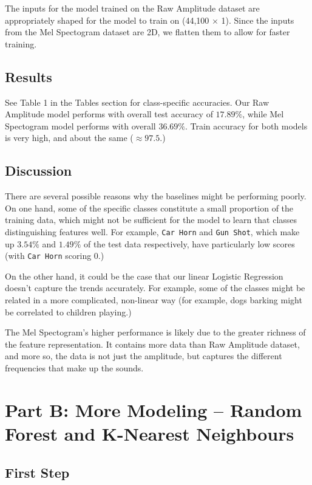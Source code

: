 \documentclass[11pt]{article}
\begin{document}
The inputs for the model trained on the Raw Amplitude dataset are appropriately shaped for the model to train on (44,100 $\times$ 1). Since the inputs from the Mel Spectogram dataset are 2D, we flatten them to allow for faster training.

\subsection{Results}

See Table 1 in the Tables section for class-specific accuracies. Our Raw Amplitude model performs with overall test accuracy of $17.89\%$, while Mel Spectogram model performs with overall $36.69\%$. Train accuracy for both models is very high, and about the same ($\approx 97.5$.)

\subsection{Discussion}

There are several possible reasons why the baselines might be performing poorly. On one hand, some of the specific classes constitute a small proportion of the training data, which might not be sufficient for the model to learn that classes distinguishing features well. For example, \texttt{Car Horn} and \texttt{Gun Shot}, which make up $3.54\%$ and $1.49\%$ of the test data respectively, have particularly low scores (with \texttt{Car Horn} scoring 0.)

On the other hand, it could be the case that our linear Logistic Regression doesn't capture the trends accurately. For example, some of the classes might be related in a more complicated, non-linear way (for example, dogs barking might be correlated to children playing.)

The Mel Spectogram's higher performance is likely due to the greater richness of the feature representation. It contains more data than Raw Amplitude dataset, and more so, the data is not just the amplitude, but captures the different frequencies that make up the sounds. 

\section{Part B: More Modeling -- Random Forest and K-Nearest Neighbours}

\subsection{First Step}
\end{document}
